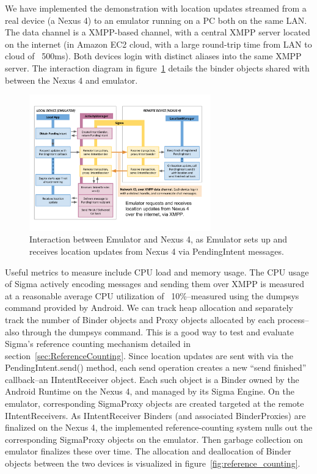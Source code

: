 \documentclass[prodmode]{acmlarge}
\begin{document}
We have implemented the demonstration with location updates streamed from a real device (a Nexus 4) to an emulator running on a PC both on the same LAN. The data channel is a XMPP-based channel, with a central XMPP server located on the internet (in Amazon EC2 cloud, with a large round-trip time from LAN to cloud of ~500ms). Both devices login with distinct aliases into the same XMPP server. The interaction diagram in figure~\ref{fig:LocationUpdateInteraction} details the binder objects shared with between the Nexus 4 and emulator.

\begin{figure}[h]
\centering
\includegraphics[width=0.7\textwidth]{drawings/LocationPendingIntentExample.pdf}
\caption{Interaction between Emulator and Nexus 4, as Emulator sets up and receives location updates from Nexus 4 via PendingIntent messages.}
\label{fig:LocationUpdateInteraction}
\end{figure}

Useful metrics to measure include CPU load and memory usage. The CPU usage of Sigma actively encoding messages and sending them over XMPP is measured at a reasonable average CPU utilization of ~10\%--measured using the dumpsys command provided by Android. We can track heap allocation and separately track the number of Binder objects and Proxy objects allocated by each process--also through the dumpsys command. This is a good way to test and evaluate Sigma's reference counting mechanism detailed in section~\ref{sec:ReferenceCounting}. Since location updates are sent with via the PendingIntent.send() method, each send operation creates a new ``send finished'' callback--an IIntentReceiver object. Each such object is a Binder owned by the Android Runtime on the Nexus 4, and managed by its Sigma Engine. On the emulator, corresponding SigmaProxy objects are created targeted at the remote IIntentReceivers. As IIntentReceiver Binders (and associated BinderProxies) are finalized on the Nexus 4, the implemented reference-counting system nulls out the corresponding SigmaProxy objects on the emulator. Then garbage collection on emulator finalizes these over time. The allocation and deallocation of Binder objects between the two devices is visualized in figure~\ref{fig:reference_counting}.
\end{document}
